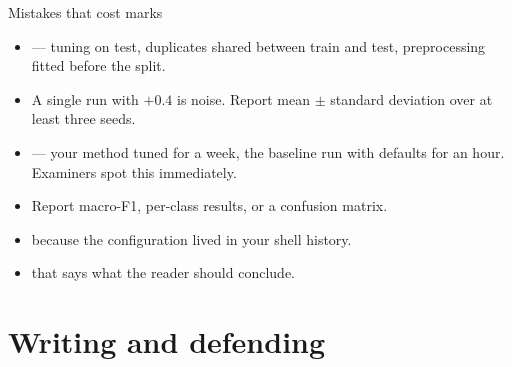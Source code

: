 \documentclass[aspectratio=169,11pt]{beamer}
\begin{document}
\begin{frame}{Mistakes that cost marks}
\begin{alertblock}{}
\begin{itemize}
  \item {} --- tuning on test, duplicates shared between
        train and test, preprocessing fitted before the split.
  \item {} A single run with $+0.4$ is noise. Report mean $\pm$
        standard deviation over at least three seeds.
  \item {} --- your method tuned for a week, the baseline
        run with defaults for an hour. Examiners spot this immediately.
  \item {} Report macro-F1, per-class results,
        or a confusion matrix.
  \item {} because the configuration
        lived in your shell history.
  \item {} that says what the
        reader should conclude.
\end{itemize}
\end{alertblock}
\end{frame}

\section{Writing and defending}
\end{document}
